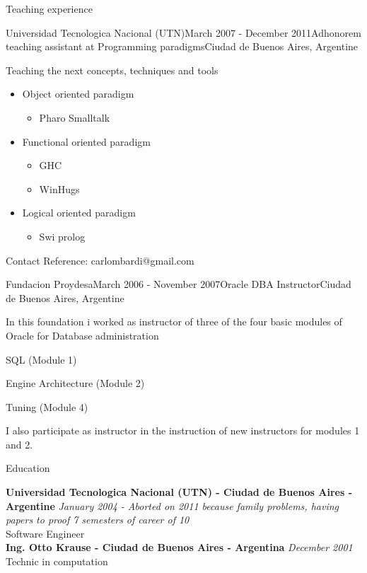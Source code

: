\documentclass{resume} %
\begin{document}
\begin{rSection}{Teaching experience}
\begin{rSubsection}{Universidad Tecnologica Nacional (UTN)}{March 2007 - December 2011}{Adhonorem teaching assistant at Programming paradigms}{Ciudad de Buenos Aires, Argentine}
\item Teaching the next concepts, techniques and tools
\begin{itemize}
	\item Object oriented paradigm
	\begin{itemize}
		\item Pharo Smalltalk
	\end{itemize}
	\item Functional oriented paradigm
	\begin{itemize}
		\item GHC
		\item WinHugs
	\end{itemize}
	\item Logical oriented paradigm 
	\begin{itemize}
		\item  Swi prolog
	\end{itemize}
\end{itemize}
\item Contact Reference: carlombardi@gmail.com
\end{rSubsection}


\begin{rSubsection}{Fundacion Proydesa}{March 2006 - November 2007}{Oracle DBA Instructor}{Ciudad de Buenos Aires, Argentine}
	\item In this foundation i worked as instructor of three of the four basic modules of Oracle for Database administration
	\item SQL (Module 1)
	\item Engine Architecture (Module 2)
	\item Tuning (Module 4)
	\item I also participate as instructor in the instruction of new instructors for modules 1 and 2.
\end{rSubsection}


\end{rSection}




\begin{rSection}{Education}


{\bf Universidad Tecnologica Nacional (UTN) - Ciudad de Buenos Aires - Argentine} \hfill {\em January 2004 - Aborted on 2011 because family problems, having papers to proof 7 semesters of career of 10 } \\ 
Software Engineer  \\

{\bf Ing. Otto Krause - Ciudad de Buenos Aires - Argentina} \hfill {\em December 2001} \\ 
Technic in computation \\
\end{rSection}
\end{document}
